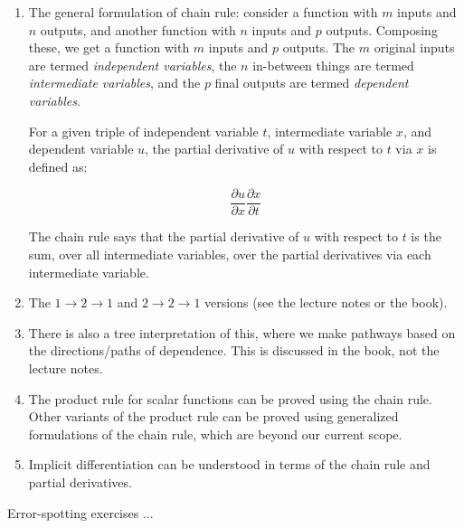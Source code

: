 \documentclass[10pt]{amsart}
\begin{document}
\begin{enumerate}
\item The general formulation of chain rule: consider a function with
  $m$ inputs and $n$ outputs, and another function with $n$ inputs and
  $p$ outputs. Composing these, we get a function with $m$ inputs and
  $p$ outputs. The $m$ original inputs are termed {\em independent
  variables}, the $n$ in-between things are termed {\em intermediate
  variables}, and the $p$ final outputs are termed {\em dependent
  variables}.

  For a given triple of independent variable $t$, intermediate
  variable $x$, and dependent variable $u$, the partial derivative of
  $u$ with respect to $t$ via $x$ is defined as:

  $$\frac{\partial u}{\partial x} \frac{\partial x}{\partial t}$$

  The chain rule says that the partial derivative of $u$ with respect
  to $t$ is the sum, over all intermediate variables, over the partial
  derivatives via each intermediate variable.
\item The $1 \to 2 \to 1$ and $2 \to 2 \to 1$ versions (see the
  lecture notes or the book).
\item There is also a tree interpretation of this, where we make
  pathways based on the directions/paths of dependence. This is
  discussed in the book, not the lecture notes.
\item The product rule for scalar functions can be proved using the
  chain rule. Other variants of the product rule can be proved using
  generalized formulations of the chain rule, which are beyond our
  current scope.
\item Implicit differentiation can be understood in terms of the chain
  rule and partial derivatives.
\end{enumerate}

Error-spotting exercises ...
\end{document}
